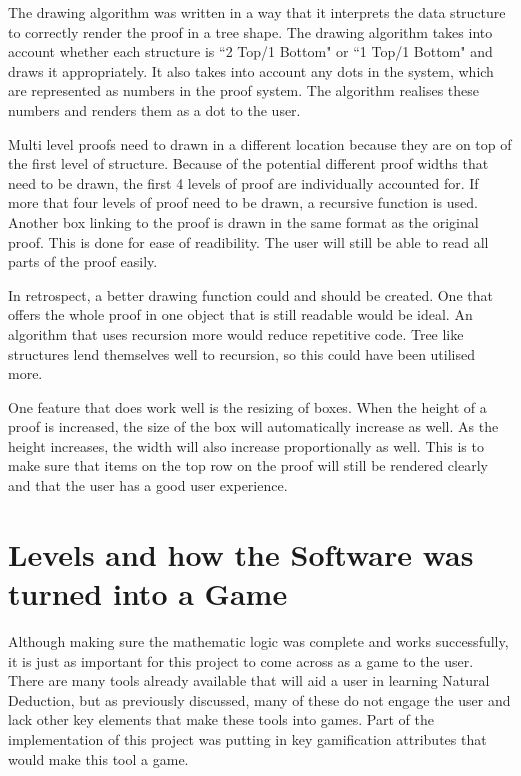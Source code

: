 The drawing algorithm was written in a way that it interprets the data structure to correctly render the proof in a tree shape. The drawing algorithm takes into account whether each structure is ``2 Top/1 Bottom" or ``1 Top/1 Bottom" and draws it appropriately. It also takes into account any dots in the system, which are represented as numbers in the proof system. The algorithm realises these numbers and renders them as a dot to the user. 

Multi level proofs need to drawn in a different location because they are on top of the first level of structure. Because of the potential different proof widths that need to be drawn, the first 4 levels of proof are individually accounted for. If more that four levels of proof need to be drawn, a recursive function is used. Another box linking to the proof is drawn in the same format as the original proof. This is done for ease of readibility. The user will still be able to read all parts of the proof easily.

In retrospect, a better drawing function could and should be created. One that offers the whole proof in one object that is still readable would be ideal. An algorithm that uses recursion more would reduce repetitive code. Tree like structures lend themselves well to recursion, so this could have been utilised more. 

One feature that does work well is the resizing of boxes. When the height of a proof is increased, the size of the box will automatically increase as well. As the height increases, the width will also increase proportionally as well. This is to make sure that items on the top row on the proof will still be rendered clearly and that the user has a good user experience.

\section{Levels and how the Software was turned into a Game}

Although making sure the mathematic logic was complete and works successfully, it is just as important for this project to come across as a game to the user. There are many tools already available that will aid a user in learning Natural Deduction, but as previously discussed, many of these do not engage the user and lack other key elements that make these tools into games. Part of the implementation of this project was putting in key gamification attributes that would make this tool a game.


